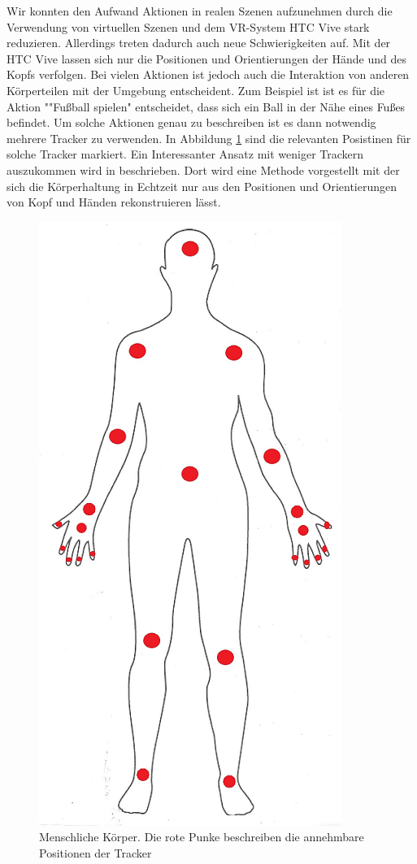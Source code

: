 Wir konnten den Aufwand Aktionen in realen Szenen aufzunehmen durch die Verwendung von virtuellen Szenen und dem VR-System HTC Vive stark reduzieren. Allerdings treten dadurch auch neue Schwierigkeiten auf. Mit der HTC Vive lassen sich nur die Positionen und Orientierungen der Hände und des Kopfs verfolgen. Bei vielen Aktionen ist jedoch auch die Interaktion von anderen Körperteilen mit der Umgebung entscheident. Zum Beispiel ist ist es für die Aktion ""Fußball spielen" entscheidet, dass sich ein Ball in der Nähe eines Fußes befindet. Um solche Aktionen genau zu beschreiben ist es dann notwendig mehrere Tracker zu verwenden. In Abbildung \ref{fig:Human-Body} sind die relevanten Posistinen für solche Tracker markiert. Ein Interessanter Ansatz mit weniger Trackern auszukommen wird in \cite{body-reconstruction} beschrieben. Dort wird eine Methode vorgestellt mit der sich die Körperhaltung in Echtzeit nur aus den Positionen und Orientierungen von Kopf und Händen rekonstruieren lässt.\newline
\begin{figure}[hbtp]
\centering
\includegraphics[width=0.2\linewidth]{human_body1.png}
\caption{Menschliche Körper. Die rote Punke beschreiben die annehmbare Positionen der Tracker}
\label{fig:Human-Body}
\end{figure}

